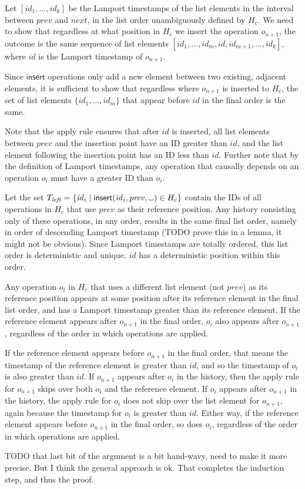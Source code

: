 \documentclass[a4paper,twocolumn,10pt]{article}
\newcommand{\placeholder}{%
  \makebox[0.7em]{%
    \kern.07em
    \vrule height.3ex
    \hrulefill
    \vrule height.3ex
    \kern.07em
  }%
}
\begin{document}
Let $[\mathit{id}_1, \dots, \mathit{id}_k]$ be the Lamport timestamps of the list elements in the interval between $\mathit{prev}$ and $\mathit{next}$, in the list order unambiguously defined by $H_c$. We need to show that regardless at what position in $H_c$ we insert the operation $o_{n+1}$, the outcome is the same sequence of list elements $[\mathit{id}_1, \dots, \mathit{id}_m, \mathit{id}, \mathit{id}_{m+1}, \dots, \mathit{id}_k]$, where $\mathit{id}$ is the Lamport timestamp of $o_{n+1}$.

Since $\mathsf{insert}$ operations only add a new element between two existing, adjacent elements, it is sufficient to show that regardless where $o_{n+1}$ is inserted to $H_c$, the set of list elements $\{\mathit{id}_1, \dots, \mathit{id}_m\}$ that appear before $\mathit{id}$ in the final order is the same.

Note that the $\mathrm{apply}$ rule ensures that after $\mathit{id}$ is inserted, all list elements between $\mathit{prev}$ and the insertion point have an ID greater than $\mathit{id}$, and the list element following the insertion point has an ID less than $\mathit{id}$. Further note that by the definition of Lamport timestamps, any operation that causally depends on an operation $o_i$ must have a greater ID than $o_i$.

Let the set $T_\mathit{left} = \{\mathit{id}_i \mid \mathsf{insert}(\mathit{id}_i, \mathit{prev}, \placeholder) \in H_c\}$ contain the IDs of all operations in $H_c$ that use $\mathit{prev}$ as their reference position. Any history consisting only of these operations, in any order, results in the same final list order, namely in order of descending Lamport timestamp (TODO prove this in a lemma, it might not be obvious). Since Lamport timestamps are totally ordered, this list order is deterministic and unique. $\mathit{id}$ has a deterministic position within this order.

Any operation $o_i$ in $H_c$ that uses a different list element (not $\mathit{prev}$) as its reference position appears at some position after its reference element in the final list order, and has a Lamport timestamp greater than its reference element. If the reference element appears after $o_{n+1}$ in the final order, $o_i$ also appears after $o_{n+1}$, regardless of the order in which operations are applied.

If the reference element appears before $o_{n+1}$ in the final order, that means the timestamp of the reference element is greater than $\mathit{id}$, and so the timestamp of $o_i$ is also greater than $\mathit{id}$. If $o_{n+1}$ appears after $o_i$ in the history, then the apply rule for $o_{n+1}$ skips over both $o_i$ and the reference element. If $o_i$ appears after $o_{n+1}$ in the history, the apply rule for $o_i$ does not skip over the list element for $o_{n+1}$, again because the timestamp for $o_i$ is greater than $\mathit{id}$. Either way, if the reference element appears before $o_{n+1}$ in the final order, so does $o_i$, regardless of the order in which operations are applied.

TODO that last bit of the argument is a bit hand-wavy, need to make it more precise. But I think the general approach is ok. That completes the induction step, and thus the proof.

{\footnotesize

{}}
\end{document}
